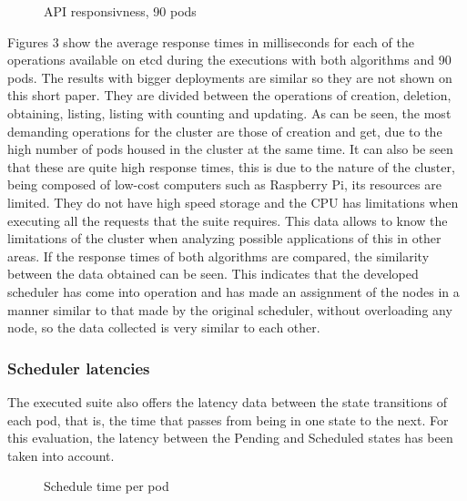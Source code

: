 \documentclass[conference]{IEEEtran}
\begin{document}
\begin{figure}[h]
\begin{center}
\strut{}
\caption{API responsivness, 90 pods}\label{fig:cluster}
\end{center}
\end{figure}

Figures 3 show the average response times in milliseconds for each of the operations available on etcd during the executions with both algorithms and 90 pods. The results with bigger deployments are similar so they are not shown on this short paper. They are divided between the operations of creation, deletion, obtaining, listing, listing with counting and updating. As can be seen, the most demanding operations for the cluster are those of creation and get, due to the high number of pods housed in the cluster at the same time. It can also be seen that these are quite high response times, this is due to the nature of the cluster, being composed of low-cost computers such as Raspberry Pi, its resources are limited. They do not have high speed storage and the CPU has limitations when executing all the requests that the suite requires. This data allows to know the limitations of the cluster when analyzing possible applications of this in other areas. If the response times of both algorithms are compared, the similarity between the data obtained can be seen. This indicates that the developed scheduler has come into operation and has made an assignment of the nodes in a manner similar to that made by the original scheduler, without overloading any node, so the data collected is very similar to each other.


\subsubsection{Scheduler latencies}\label{sec:schedlat}
The executed suite also offers the latency data between the state transitions of each pod, that is, the time that passes from being in one state to the next. For this evaluation, the latency between the Pending and Scheduled states has been taken into account.

\begin{figure}[h]
\begin{center}
\strut{}
\caption{Schedule time per pod}\label{fig:cluster}
\end{center}
\end{figure}
\end{document}
